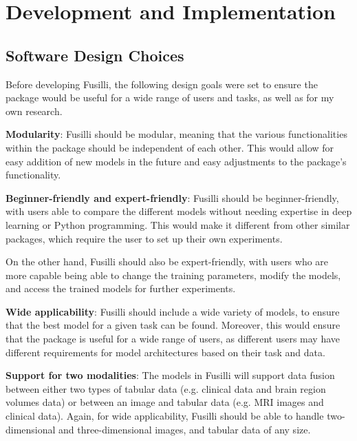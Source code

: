 \section{Development and Implementation}

\subsection{Software Design Choices}

Before developing Fusilli, the following design goals were set to ensure the package would be useful for a wide range of users and tasks, as well as for my own research.
\vspace{0.3cm}

\noindent\textbf{Modularity}: Fusilli should be modular, meaning that the various functionalities within the package should be independent of each other.
This would allow for easy addition of new models in the future and easy adjustments to the package's functionality.

\vspace{0.3cm}

\noindent\textbf{Beginner-friendly and expert-friendly}:  Fusilli should be beginner-friendly, with users able to compare the different models without needing expertise in deep learning or Python programming.
This would make it different from other similar packages, which require the user to set up their own experiments.

On the other hand, Fusilli should also be expert-friendly, with users who are more capable being able to change the training parameters, modify the models, and access the trained models for further experiments.

\vspace{0.3cm}

\noindent\textbf{Wide applicability}:
Fusilli should include a wide variety of models, to ensure that the best model for a given task can be found.
Moreover, this would ensure that the package is useful for a wide range of users, as different users may have different requirements for model architectures based on their task and data.

\vspace{0.3cm}

\noindent\textbf{Support for two modalities}: The models in Fusilli will support data fusion between either two types of tabular data (e.g. clinical data and brain region volumes data) or between an image and tabular data (e.g. MRI images and clinical data).
Again, for wide applicability, Fusilli should be able to handle two-dimensional and three-dimensional images, and tabular data of any size.


